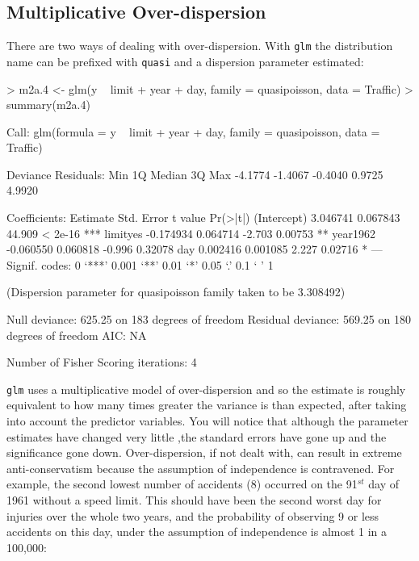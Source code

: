 \documentclass{article}
\begin{document}
\subsection{Multiplicative Over-dispersion}

There are two ways of dealing with over-dispersion. With \texttt{glm} the distribution name can be prefixed with \texttt{quasi} and a dispersion parameter estimated:

\begin{Schunk}
\begin{Sinput}
> m2a.4 <- glm(y ~ limit + year + day, family = quasipoisson, data = Traffic)
> summary(m2a.4)
\end{Sinput}
\begin{Soutput}
Call:
glm(formula = y ~ limit + year + day, family = quasipoisson, 
    data = Traffic)

Deviance Residuals: 
    Min       1Q   Median       3Q      Max  
-4.1774  -1.4067  -0.4040   0.9725   4.9920  

Coefficients:
             Estimate Std. Error t value Pr(>|t|)    
(Intercept)  3.046741   0.067843  44.909  < 2e-16 ***
limityes    -0.174934   0.064714  -2.703  0.00753 ** 
year1962    -0.060550   0.060818  -0.996  0.32078    
day          0.002416   0.001085   2.227  0.02716 *  
---
Signif. codes:  0 ‘***’ 0.001 ‘**’ 0.01 ‘*’ 0.05 ‘.’ 0.1 ‘ ’ 1 

(Dispersion parameter for quasipoisson family taken to be 3.308492)

    Null deviance: 625.25  on 183  degrees of freedom
Residual deviance: 569.25  on 180  degrees of freedom
AIC: NA

Number of Fisher Scoring iterations: 4
\end{Soutput}
\end{Schunk}

\texttt{glm} uses a multiplicative model of over-dispersion and so the estimate is roughly equivalent to how many times greater the variance is than expected, after taking into account the predictor variables. You will notice that although the parameter estimates have changed very little ,the standard errors have gone up and the significance gone down. Over-dispersion, if not dealt with, can result in extreme anti-conservatism because the assumption of independence is contravened. For example, the second lowest number of accidents (8) occurred on the 91$^{st}$ day of 1961 without a speed limit. This should have been the second worst day for injuries over the whole two years, and the probability of observing 9 or less accidents on this day, under the assumption of independence is almost 1 in a 100,000:
\end{document}
